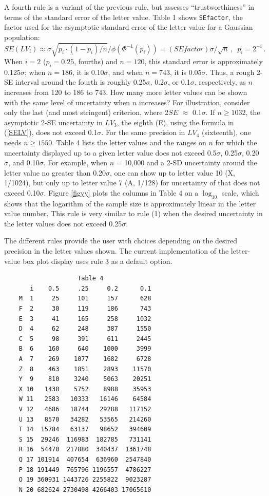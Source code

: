 \documentclass[11pt]{article}
\begin{document}
A fourth rule is a variant of the previous rule, but assesses
``trustworthiness'' in terms of the standard error of the
letter value.  Table 1 shows \texttt{SEfactor}, the factor
used for the asymptotic standard error of the letter value
for a Gaussian population:
\begin{equation}
SE(LV_i) \approx \sigma \sqrt{p_i \cdot (1 - p_i)/ n} / \phi(\Phi^{-1}(p_i)) 
 = (SEfactor) \sigma / \sqrt{n} \, ,
 \, \, \, p_i = 2^{-i} \, .
\label{SELV}
\end{equation}
When $i = 2$ ($p_i = 0.25$, fourths) and $n = 120$,
this standard error is approximately 0.125$\sigma$; when
$n = 186$, it is 0.10$\sigma$, and when $n = 743$, 
it is 0.05$\sigma$.  Thus, a rough 2-SE interval around
the fourth is roughly 0.25$\sigma$, 0.2$\sigma$, or 0.1$\sigma$,
respectively, as $n$ increases from 120 to 186 to 743.
How many more letter values can be shown with the same
level of uncertainty when $n$ increases?  For illustration,
consider only the last (and most stringent) criterion,
where 2$SE$ $\approx$ 0.1$\sigma$.  If $n \geq 1032$, 
the asymptotic 2-SE uncertainty in $LV_3$, the eighth (E), 
using the formula in (\ref{SELV}), does not exceed 0.1$\sigma$.
For the same precision in $LV_4$ (sixteenth), one needs
$n \geq 1550$.
Table 4 lists the letter values and the ranges on $n$
for which the uncertainty displayed up to a given letter
value does not exceed 0.5$\sigma$, 0.25$\sigma$,
0.20$\sigma$, and 0.10$\sigma$.  
For example, when $n$ = 10,000 and a 2-SD uncertainty
around the letter value no greater than 0.20$\sigma$, 
one can show up to letter value 10 (X, 1/1024), but only
up to letter value 7 (A, 1/128) for uncertainty of that
does not exceed 0.10$\sigma$.
Figure \ref{figyy} plots the columns in Table 4 on a $\log_10$
scale, which shows that the logarithm of the sample size is
approximately linear in the letter value number.  This rule
is very similar to rule (1) when the desired uncertainty
in the letter values does not exceed 0.25$\sigma$.

The different rules provide the user with choices depending
on the desired precision in the letter values shown.
The current implementation of the letter-value box plot 
display uses rule 3 as a default option.

\begin{verbatim}
                    Table 4
       i    0.5     .25     0.2      0.1
    M  1     25     101     157      628
    F  2     30     119     186      743
    E  3     41     165     258     1032
    D  4     62     248     387     1550
    C  5     98     391     611     2445
    B  6    160     640    1000     3999
    A  7    269    1077    1682     6728
    Z  8    463    1851    2893    11570
    Y  9    810    3240    5063    20251
    X 10   1438    5752    8988    35953
    W 11   2583   10333   16146    64584
    V 12   4686   18744   29288   117152
    U 13   8570   34282   53565   214260
    T 14  15784   63137   98652   394609
    S 15  29246  116983  182785   731141
    R 16  54470  217880  340437  1361748
    Q 17 101914  407654  636960  2547840
    P 18 191449  765796 1196557  4786227
    O 19 360931 1443726 2255822  9023287
    N 20 682624 2730498 4266403 17065610
\end{verbatim}
\end{document}
